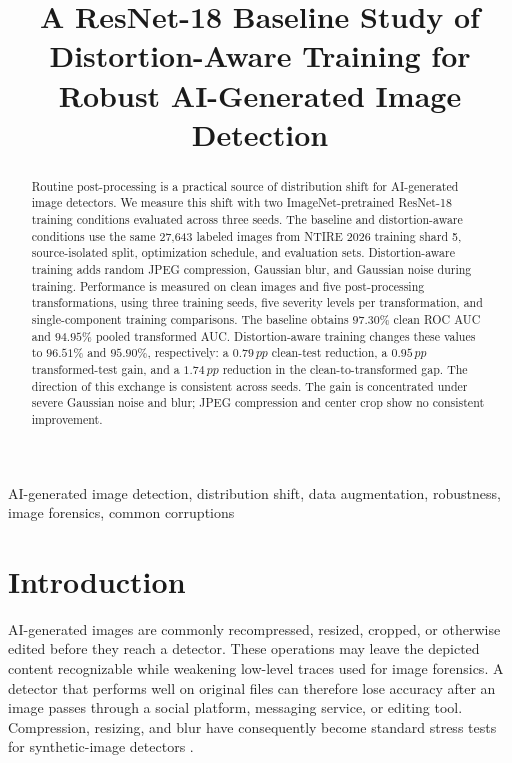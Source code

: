 \documentclass[conference]{IEEEtran}
\title{A ResNet-18 Baseline Study of Distortion-Aware Training for\\
Robust AI-Generated Image Detection}
\author{
\IEEEauthorblockN{Junxuan Cai (Student ID: 521370910086)}
\IEEEauthorblockA{
ECE4880J Computer Vision\\
Global College, Shanghai Jiao Tong University\\
Shanghai, China
}
}
\newcommand{\pp}{\,pp}
\begin{document}
\maketitle

\begin{abstract}
Routine post-processing is a practical source of distribution shift for
AI-generated image detectors. We measure this shift with two
ImageNet-pretrained ResNet-18 training conditions evaluated across three
seeds. The baseline and distortion-aware conditions use the same 27,643 labeled images
from NTIRE 2026 training shard 5, source-isolated split, optimization schedule,
and evaluation sets. Distortion-aware training adds random JPEG compression, Gaussian
blur, and Gaussian noise during training. Performance is measured on clean
images and five post-processing transformations, using three training seeds,
five severity levels per transformation, and single-component training
comparisons. The baseline obtains $97.30\%$ clean ROC AUC and $94.95\%$ pooled
transformed AUC. Distortion-aware training changes these values to $96.51\%$
and $95.90\%$, respectively: a $0.79\pp$ clean-test reduction, a $0.95\pp$
transformed-test gain, and a $1.74\pp$ reduction in the clean-to-transformed
gap. The direction of this exchange is consistent across seeds. The gain is
concentrated under severe Gaussian noise and blur; JPEG compression and center
crop show no consistent improvement.
\end{abstract}

\begin{IEEEkeywords}
AI-generated image detection, distribution shift, data augmentation,
robustness, image forensics, common corruptions
\end{IEEEkeywords}

\section{Introduction}
\label{sec:introduction}

AI-generated images are commonly recompressed, resized, cropped, or otherwise
edited before they reach a detector. These operations may leave the depicted
content recognizable while weakening low-level traces used for image
forensics. A detector that performs well on original files can therefore lose
accuracy after an image passes through a social platform, messaging service,
or editing tool. Compression, resizing, and blur have consequently become
standard stress tests for synthetic-image detectors
\cite{wang2020cnn,corvi2023diffusion,zhu2023genimage}.
\end{document}
